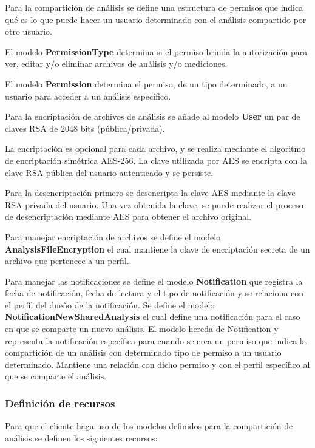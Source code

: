 Para la compartición de análisis se define una estructura de permisos que indica qué es lo que puede hacer un usuario determinado con el análisis compartido por otro usuario.

El modelo \textbf{PermissionType} determina si el permiso brinda la autorización para ver, editar y/o eliminar archivos de análisis y/o mediciones.

El modelo \textbf{Permission} determina el permiso, de un tipo determinado, a un usuario para acceder a un análisis específico.

Para la encriptación de archivos de análisis se añade al modelo \textbf{User} un par de claves RSA de 2048 bits (pública/privada).

La encriptación es opcional para cada archivo, y se realiza mediante el algoritmo de encriptación simétrica AES-256. La clave utilizada por AES se encripta con la clave RSA pública del usuario autenticado y se persiste.

Para la desencriptación primero se desencripta la clave AES mediante la clave RSA privada del usuario. Una vez obtenida la clave, se puede realizar el proceso de desencriptación mediante AES para obtener el archivo original.

Para manejar encriptación de archivos se define el modelo \textbf{AnalysisFileEncryption} el cual mantiene la clave de encriptación secreta de un archivo que pertenece a un perfil.

Para manejar las notificaciones se define el modelo \textbf{Notification} que registra la fecha de notificación, fecha de lectura y el tipo de notificación y se relaciona con el perfil del dueño de la notificación. Se define el modelo \textbf{NotificationNewSharedAnalysis} el cual define una notificación para el caso en que se comparte un nuevo análisis. El modelo hereda de Notification y representa la notificación específica para cuando se crea un permiso que indica la compartición de un análisis con determinado tipo de permiso a un usuario determinado. Mantiene una relación con dicho permiso y con el perfil específico al que se comparte el análisis.

\subsubsection{Definición de recursos}

Para que el cliente haga uso de los modelos definidos para la compartición de análisis se definen los siguientes recursos:


